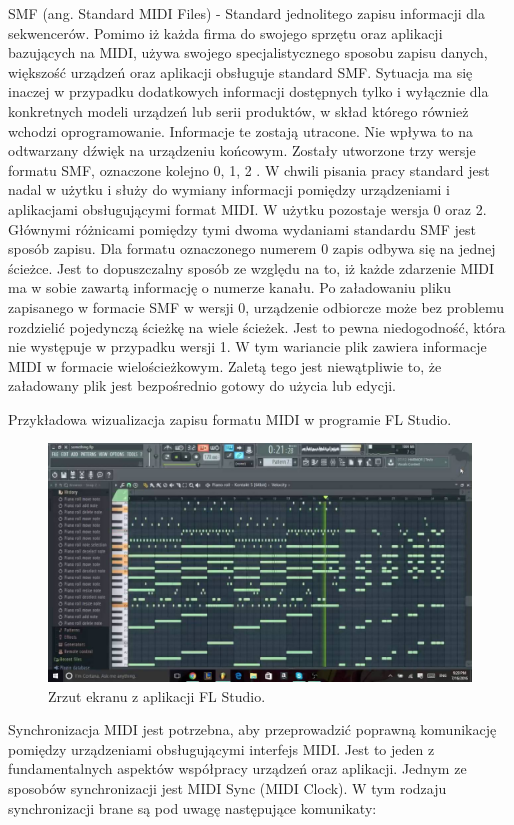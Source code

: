 SMF (ang. Standard MIDI Files) - Standard jednolitego zapisu informacji dla sekwencerów. Pomimo iż każda firma do swojego sprzętu oraz aplikacji bazujących na MIDI, używa swojego specjalistycznego sposobu zapisu danych, większość urządzeń oraz aplikacji obsługuje standard SMF. Sytuacja ma się inaczej w przypadku dodatkowych informacji dostępnych tylko i wyłącznie dla konkretnych modeli urządzeń lub serii produktów, w skład którego również wchodzi oprogramowanie. Informacje te zostają utracone. Nie wpływa to na odtwarzany dźwięk na urządzeniu końcowym.
Zostały utworzone trzy wersje formatu SMF, oznaczone kolejno 0, 1, 2 . W chwili pisania pracy standard jest nadal w użytku i służy do wymiany informacji pomiędzy urządzeniami i  aplikacjami obsługującymi format MIDI. W użytku pozostaje wersja 0 oraz 2. Głównymi różnicami pomiędzy tymi dwoma wydaniami standardu SMF jest sposób zapisu. Dla formatu oznaczonego numerem 0 zapis odbywa się na jednej ścieżce. Jest to dopuszczalny sposób ze względu na to, iż każde zdarzenie MIDI ma w sobie zawartą informację o numerze kanału. Po załadowaniu pliku zapisanego w formacie SMF w wersji 0, urządzenie odbiorcze może bez problemu rozdzielić pojedynczą ścieżkę na wiele ścieżek. Jest to pewna niedogodność, która nie występuje w przypadku wersji 1. W tym wariancie plik zawiera informacje MIDI w formacie wielościeżkowym. Zaletą tego jest niewątpliwie to, że załadowany plik jest bezpośrednio gotowy do użycia lub edycji.


Przykładowa wizualizacja zapisu formatu MIDI w programie FL Studio.

\begin{figure}[h!]
  \centering
  \includegraphics[width=0.5\linewidth]{rys/fl1}
  \caption{Zrzut ekranu z aplikacji FL Studio.}
  \label{fig:schemat}
\end{figure}


Synchronizacja MIDI jest potrzebna, aby przeprowadzić poprawną komunikację pomiędzy urządzeniami obsługującymi interfejs MIDI. Jest to jeden z fundamentalnych aspektów współpracy urządzeń oraz aplikacji. Jednym ze sposobów synchronizacji jest MIDI Sync (MIDI Clock). W tym rodzaju synchronizacji brane są pod uwagę następujące komunikaty:



